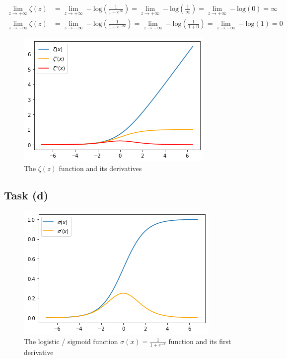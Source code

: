 \documentclass[onecolumn]{article}
\begin{document}
\[
\begin{aligned}
	\lim_{z\to+\infty}\zeta(z)&=	\lim_{z\to+\infty}-\text{log}\left(\frac{1}{1+e^\infty}\right)
	=\lim_{z\to+\infty}-\text{log}\left(\frac{1}{\infty}\right)
	=\lim_{z\to+\infty}-\text{log}\left(0\right)=\infty \\
	\lim_{z\to-\infty}\zeta(z)&=\lim_{z\to-\infty}-\text{log}\left(\frac{1}{1+e^{-\infty}}\right)
	=\lim_{z\to-\infty}-\text{log}\left(\frac{1}{1+0}\right)
	=\lim_{z\to-\infty}-\text{log}\left(1\right)=0
\end{aligned}
\]
\begin{figure}[hbt!]
	\centering
	\includegraphics[width=.6\linewidth]{taskc.png}
	\caption{The $\zeta(z)$ function and its derivatives}
\end{figure}

\subsection{Task (d)}
\begin{figure}[hbt!]
	\centering
	\includegraphics[width=.6\linewidth]{taskd.png}
	\caption{The logistic / sigmoid function $\sigma(x)=\frac{1}{1+e^{-x}}$ function and its first derivative}
\end{figure}
\end{document}
